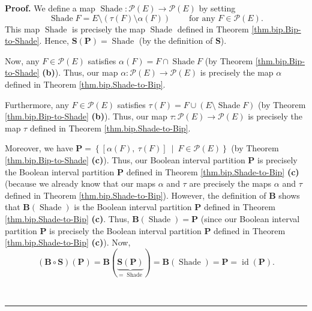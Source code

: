 \documentclass[numbers=enddot,12pt,final,onecolumn]{scrartcl}%
\theoremstyle{definition}
\newenvironment{proof}[1][Proof]{\noindent\textbf{#1.} }{\ \rule{0.5em}{0.5em}}
\newenvironment{verlong}{}{}
\begin{document}
\begin{verlong}
\begin{proof}
We define a map $\operatorname*{Shade}:\mathcal{P}\left(  E\right)
\rightarrow\mathcal{P}\left(  E\right)  $ by setting%
\[
\operatorname*{Shade}F=E\setminus\left(  \tau\left(  F\right)  \setminus
\alpha\left(  F\right)  \right)  \ \ \ \ \ \ \ \ \ \ \text{for any }%
F\in\mathcal{P}\left(  E\right)  .
\]
This map $\operatorname*{Shade}$ is precisely the map $\operatorname*{Shade}$
defined in Theorem \ref{thm.bip.Bip-to-Shade}. Hence, $\mathbf{S}\left(
\mathbf{P}\right)  =\operatorname*{Shade}$ (by the definition of $\mathbf{S}$).

Now, any $F\in\mathcal{P}\left(  E\right)  $ satisfies $\alpha\left(
F\right)  =F\cap\operatorname*{Shade}F$ (by Theorem \ref{thm.bip.Bip-to-Shade}
\textbf{(b)}). Thus, our map $\alpha:\mathcal{P}\left(  E\right)
\rightarrow\mathcal{P}\left(  E\right)  $ is precisely the map $\alpha$
defined in Theorem \ref{thm.bip.Shade-to-Bip}.

Furthermore, any $F\in\mathcal{P}\left(  E\right)  $ satisfies $\tau\left(
F\right)  =F\cup\left(  E\setminus\operatorname*{Shade}F\right)  $ (by Theorem
\ref{thm.bip.Bip-to-Shade} \textbf{(b)}). Thus, our map $\tau:\mathcal{P}%
\left(  E\right)  \rightarrow\mathcal{P}\left(  E\right)  $ is precisely the
map $\tau$ defined in Theorem \ref{thm.bip.Shade-to-Bip}.

Moreover, we have $\mathbf{P}=\left\{  \left[  \alpha\left(  F\right)
,\ \tau\left(  F\right)  \right]  \ \mid\ F\in\mathcal{P}\left(  E\right)
\right\}  $ (by Theorem \ref{thm.bip.Bip-to-Shade} \textbf{(c)}). Thus, our
Boolean interval partition $\mathbf{P}$ is precisely the Boolean interval
partition $\mathbf{P}$ defined in Theorem \ref{thm.bip.Shade-to-Bip}
\textbf{(c)} (because we already know that our maps $\alpha$ and $\tau$ are
precisely the maps $\alpha$ and $\tau$ defined in Theorem
\ref{thm.bip.Shade-to-Bip}). However, the definition of $\mathbf{B}$ shows
that $\mathbf{B}\left(  \operatorname*{Shade}\right)  $ is the Boolean
interval partition $\mathbf{P}$ defined in Theorem \ref{thm.bip.Shade-to-Bip}
\textbf{(c)}. Thus, $\mathbf{B}\left(  \operatorname*{Shade}\right)
=\mathbf{P}$ (since our Boolean interval partition $\mathbf{P}$ is precisely
the Boolean interval partition $\mathbf{P}$ defined in Theorem
\ref{thm.bip.Shade-to-Bip} \textbf{(c)}). Now,%
\[
\left(  \mathbf{B}\circ\mathbf{S}\right)  \left(  \mathbf{P}\right)
=\mathbf{B}\left(  \underbrace{\mathbf{S}\left(  \mathbf{P}\right)
}_{=\operatorname*{Shade}}\right)  =\mathbf{B}\left(  \operatorname*{Shade}%
\right)  =\mathbf{P}=\operatorname*{id}\left(  \mathbf{P}\right)  .
\]



\end{proof}
\end{verlong}
\end{document}
